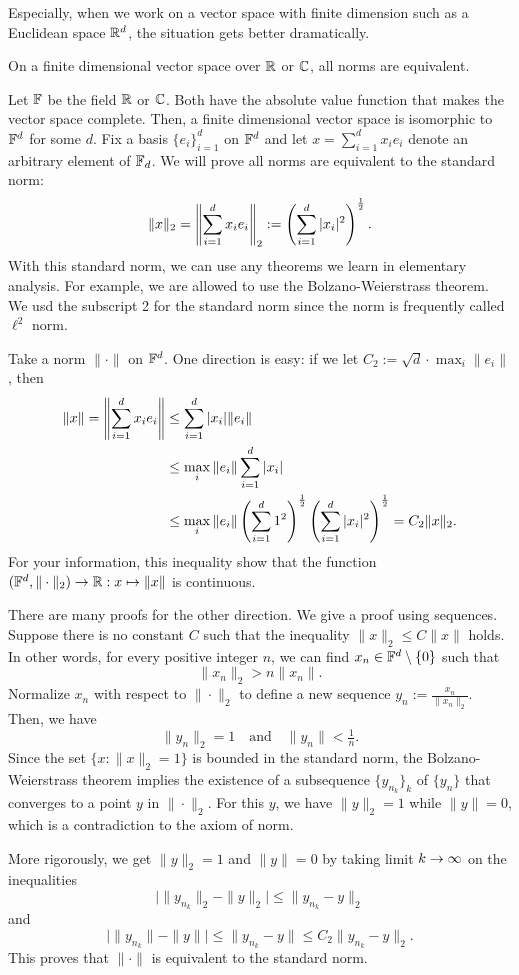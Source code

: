 Especially, when we work on a vector space with finite dimension such as a Euclidean space $\mathbb{R}^d$, the situation gets better dramatically.

\begin{thm}\label{thm:equivalent norms on finite dimension}
On a finite dimensional vector space over $\mathbb{R}$ or $\mathbb{C}$, all norms are equivalent.
\end{thm}
\begin{pf}
Let $\mathbb{F}$ be the field $\mathbb{R}$ or $\mathbb{C}$.
Both have the absolute value function that makes the vector space complete.
Then, a finite dimensional vector space is isomorphic to $\mathbb{F}^d$ for some $d$.
Fix a basis $\{e_i\}_{i=1}^d$ on $\mathbb{F}^d$ and let $x=\sum_{i=1}^dx_ie_i$ denote an arbitrary element of $\mathbb{F}_d$.
We will prove all norms are equivalent to the standard norm:
\[\|x\|_2=\left\lVert\sum_{i=1}^dx_ie_i\right\rVert_2:=\left(\sum_{i=1}^d|x_i|^2\right)^{\frac12}.\]
With this standard norm, we can use any theorems we learn in elementary analysis.
For example, we are allowed to use the Bolzano-Weierstrass theorem.
We usd the subscript 2 for the standard norm since the norm is frequently called $\ell^2$ norm.


Take a norm $\|\cdot\|$ on $\mathbb{F}^d$.
One direction is easy: if we let $C_2:=\sqrt{d}\cdot\max_i\|e_i\|$, then
\begin{align*}
\|x\|=\left\lVert\sum_{i=1}^dx_ie_i\right\rVert&\le\sum_{i=1}^d|x_i|\|e_i\|\\
&\le\max_i\|e_i\|\sum_{i=1}^d|x_i|\\
&\le\max_i\|e_i\|\left(\sum_{i=1}^d1^2\right)^{\frac12}\left(\sum_{i=1}^d|x_i|^2\right)^{\frac12}=C_2\|x\|_2.
\end{align*}
For your information, this inequality show that the function $(\F^d,\|\cdot\|_2)\to\R:x\mapsto\|x\|$ is continuous.

There are many proofs for the other direction.
We give a proof using sequences.
Suppose there is no constant $C$ such that the inequality $\|x\|_2\le C\|x\|$ holds.
In other words, for every positive integer $n$, we can find $x_n\in\mathbb{F}^d\setminus\{0\}$ such that
\[\|x_n\|_2>n\|x_n\|.\]
Normalize $x_n$ with respect to $\|\cdot\|_2$ to define a new sequence $y_n:=\frac{x_n}{\|x_n\|_2}$.
Then, we have
\[\|y_n\|_2=1\quad\text{and}\quad\|y_n\|<\tfrac1n.\]
Since the set $\{x:\|x\|_2=1\}$ is bounded in the standard norm, the Bolzano-Weierstrass theorem implies the existence of a subsequence $\{y_{n_k}\}_k$ of $\{y_n\}$ that converges to a point $y$ in $\|\cdot\|_2$.
For this $y$, we have $\|y\|_2=1$ while $\|y\|=0$, which is a contradiction to the axiom of norm.

More rigorously, we get $\|y\|_2=1$ and $\|y\|=0$ by taking limit $k\to\oo$ on the inequalities
\[\bigl|\|y_{n_k}\|_2-\|y\|_2\bigr|\le\|y_{n_k}-y\|_2\]
and
\[\bigl|\|y_{n_k}\|-\|y\|\bigr|\le\|y_{n_k}-y\|\le C_2\|y_{n_k}-y\|_2.\]
This proves that $\|\cdot\|$ is equivalent to the standard norm.
\end{pf}

